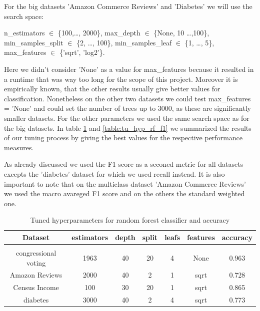 \documentclass[a4paper,12pt]{article}
\begin{document}
    For the big datasets 'Amazon Commerce Reviews' and 'Diabetes' we will use the search space:
 

\begin{center}
    \parbox{0.75\textwidth}{%
    \raggedright
    \textsf{n\_estimators} \(\in\) \{100,\dots, 2000\}, \textsf{max\_depth} \(\in\) \{None, 10 \dots ,100\}, \\
    \textsf{min\_samples\_split} \(\in\) \{2, \dots, 100\}, \textsf{min\_samples\_leaf} \(\in\) \{1, \dots, 5\}, \\
    \textsf{max\_features} \(\in\) \{'sqrt', 'log2'\}.}
\end{center}

Here we didn't consider 'None' as a value for \textsf{max\_features} because it resulted in a runtime that was way too long for the scope of this project. Moreover it is empirically known, that the other results usually give better values for classification. Nonetheless on the other two datasets we could test \textsf{max\_features} = 'None' and could set the number of trees up to 3000, as these are significantly smaller datasets. For the other parameters we used the same search space as for the big datasets. In table \ref{table:tu_hyp_rf_ac} and \ref{table:tu_hyp_rf_f1} we summarized the results of our tuning process by giving the best values for the respective performance measures.

As already discussed we used the F1 score as a seconed metric for all datasets excepts the 'diabetes' dataset for which we used recall instead. It is also important to note that on the multiclass dataset 'Amazon Commerce Reviews' we used the macro avareged F1 score and on the others the standard weighted one.

\begin{table}[h!]
    \centering
    \begin{tabular}{|c|c|c|c|c|c|c|}
    \hline
    Dataset & \textsf{estimators} & \textsf{depth} & \textsf{split} & \textsf{leafs} & \textsf{features} & accuracy \\
    \hline
    \multicolumn{7}{c}{\vspace{-0.4cm}} \\ %
    \hline
    congressional voting & 1963 & 40 & 20 & 4 & None & 0.963 \\%
    \hline
    Amazon Reviews & 2000 & 40 & 2 & 1 & sqrt & 0.728 \\%
    \hline
    Census Income & 100 & 30 & 20 & 1 & sqrt & 0.865 \\%
    \hline
    diabetes & 3000 & 40 & 2 & 4 & sqrt & 0.773 \\%
    \hline
    \end{tabular}
    \caption{Tuned hyperparameters for random forest classifier and accuracy} 
    \label{table:tu_hyp_rf_ac}
    \end{table}
\end{document}
